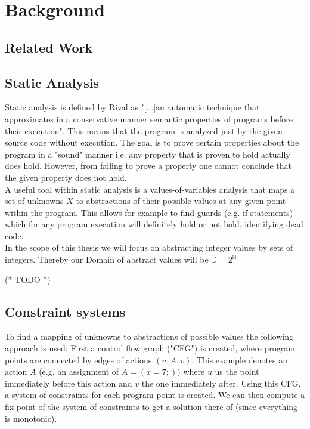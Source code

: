 
\chapter{Background}\label{chapter:Background}

  \section{Related Work}
  \section{Static Analysis}
  Static analysis is defined by Rival \cite{rival2020introduction} as "[...]an automatic technique that approximates in a conservative manner semantic properties of programs before their execution". This means that the program is analyzed just by the given source code without execution. The goal is to prove certain properties about the program in a "sound" manner i.e. any property that is proven to hold actually does hold. However, from failing to prove a property one cannot conclude that the given property does not hold.\\
  A useful tool within static analysis is a values-of-variables analysis that maps a set of unknowns $X$ to abstractions of their possible values at any given point within the program. This allows for example to find guards (e.g. \textsf{if}-statements) which for any program execution will definitely hold or not hold, identifying dead code.\\ %
  In the scope of this thesis we will focus on abstracting integer values by sets of integers. Thereby our Domain of abstract values will be $\mathbb{D} = 2^\mathbb{N}$

  (* TODO *)
  \section{Constraint systems}
  To find a mapping of unknowns to abstractions of possible values the following approach is used: First a control flow graph ("CFG") is created, where program points are connected by edges of actions $(u, A, v)$. This example denotes an action $A$ (e.g. an assignment of $A = (x = 7;)$) where $u$ us the point immediately before this action and $v$ the one immediately after. Using this CFG, a system of constraints for each program point is created. We can then compute a fix point of the system of constraints to get a solution there of (since everything is monotonic).

  



